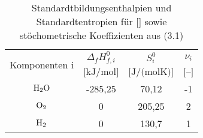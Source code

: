 \documentclass{article}
\begin{document}
\begin{table}[ht]
		\centering
		\caption{Standardtbildungsenthalpien und Standardtentropien für  [\cite{?%
		}] sowie stöchometrische Koeffizienten aus (3.1)}
		\begin{tabular}{c c c c}
		\toprule
		\multirow{2}{*}{Komponenten i} & 
		\multicolumn{1}{c}{$\Delta_f H^0_{f,i}$} & 
		\multicolumn{1}{c}{$S^0_i$} &
		\multicolumn{1}{c}{$\nu_i$}
		\\
		& 
		\multicolumn{1}{c}{$\textrm{[kJ/mol]}$}& 
		\multicolumn{1}{c}{$\textrm{[J/(molK)]}$} &
		\multicolumn{1}{c}{$\textrm{[--]}$}
		\\
		\midrule
		$\ce{H2O}$ & -285,25 & 70,12 & -1\\
		$\ce{O2}$ & 0 & 205,25 & 2\\
		$\ce{H2}$ & 0 & 130,7 & 1\\
		\bottomrule
		\end{tabular}
		\label{tab:rule}
		\end{table}		
\end{document}
